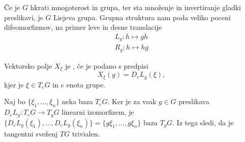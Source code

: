 
Če je $G$ hkrati mnogoterost in grupa, ter sta množenje in invertiranje gladki
preslikavi, je $G$ Liejeva grupa.
Grupna struktura nam poda veliko poceni difeomorfizmov, na primer leve in desne
translacije
\begin{gather*}
  L_g: h \mapsto gh \\
  R_g: h \mapsto hg
\end{gather*}

\begin{definicija}
  Vektorsko polje $X_\xi$ je , če je
  podano s predpisi
  \[
	X_\xi(g) = D_e L_g (\xi),
  \]
  kjer je $\xi \in T_e G$ in $e$ enota grupe.
\end{definicija}

Naj bo $\{\xi_1, \ldots, \xi_n\}$ neka baza $T_e G$.
Ker je za vsak $g \in G$ preslikava $D_e L_g: T_e G \to T_g G$ linearni
izomorfizem, je $\{ D_e L_g(\xi_1), \ldots, D_e L_g(\xi_n) \} = \{ g \xi_1,
\ldots, g \xi_n \}$ baza $T_g G$.
Iz tega sledi, da je tangentni sveženj $T G$ trivialen.

